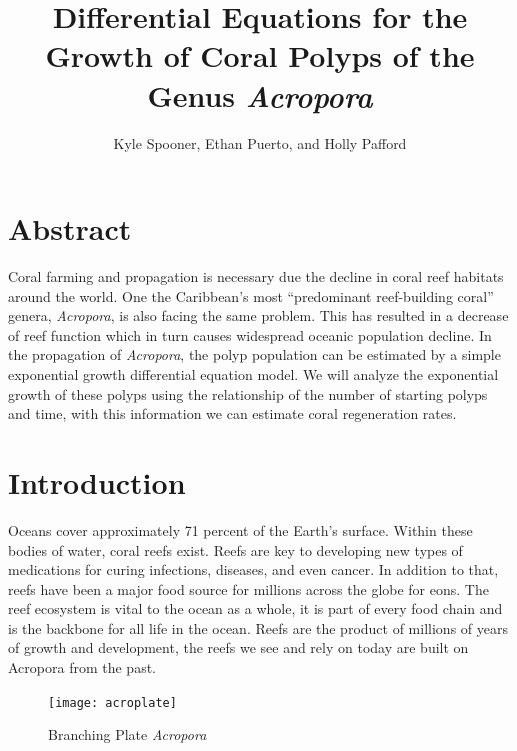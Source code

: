 \documentclass[12pt]{article}
\begin{document}
	\title{Differential Equations for the Growth of Coral Polyps of the Genus \textit{Acropora}}
	\author{Kyle Spooner, Ethan Puerto, and Holly Pafford}
	\maketitle
	\newpage

	\tableofcontents
	\newpage
	
	\section{Abstract}
		Coral farming and propagation is necessary due the decline in coral reef habitats around the world. One the Caribbean's most ``predominant reef-building coral'' genera, \textit{Acropora}, is also facing the same problem. This has resulted in a decrease of reef function which in turn causes widespread oceanic population decline. In the propagation of \textit{Acropora}, the polyp population can be estimated by a simple exponential growth differential equation model. We will analyze the exponential growth of these polyps using the relationship of the number of starting polyps and time, with this information we can estimate coral regeneration rates.
	\newpage
	
	\section{Introduction}


	
	Oceans cover approximately 71 percent of the Earth’s surface. Within these bodies of water, coral reefs exist. Reefs are key to developing new types of medications for curing infections, diseases, and even cancer. In addition to that, reefs have been a major food source for millions across the globe for eons. The reef ecosystem is vital to the ocean as a whole, it is part of every food chain and is the backbone for all life in the ocean. Reefs are the product of millions of years of growth and development, the reefs we see and rely on today are built on Acropora from the past.\cite{wiki:Acropora}
	

	
	
	\begin{figure}
		\begin{center}
			\texttt{[image: acroplate]}
		\end{center}
		\caption{Branching Plate \textit{Acropora}\cite{wiki:Acropora}}
	\end{figure}
	
\end{document}
